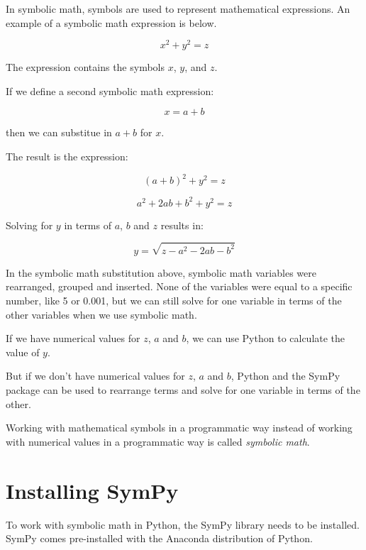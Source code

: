 \documentclass{book}
\begin{document}
In symbolic math, symbols are used to represent mathematical
expressions. An example of a symbolic math expression is below.

\[ x^{2} + y^{2} = z \]

The expression contains the symbols \(x\), \(y\), and \(z\).

If we define a second symbolic math expression:

\[ x = a + b \]

then we can substitue in \(a + b\) for \(x\).

The result is the expression:

\[ (a + b)^{2} + y^{2} = z \]

\[ a^{2} + 2ab + b^{2} + y^{2} = z \]

Solving for \(y\) in terms of \(a\), \(b\) and \(z\) results in:

\[ y = \sqrt{z - a^{2} - 2ab - b^{2}} \]

In the symbolic math substitution above, symbolic math variables were
rearranged, grouped and inserted. None of the variables were equal to a
specific number, like 5 or 0.001, but we can still solve for one
variable in terms of the other variables when we use symbolic math.
    




    
        If we have numerical values for \(z\), \(a\) and \(b\), we can use
Python to calculate the value of \(y\).

But if we don't have numerical values for \(z\), \(a\) and \(b\), Python
and the SymPy package can be used to rearrange terms and solve for one
variable in terms of the other.

Working with mathematical symbols in a programmatic way instead of
working with numerical values in a programmatic way is called
\emph{symbolic math}.
    




    
        \hypertarget{installing-sympy}{%
\section{Installing SymPy}\label{installing-sympy}}
    




    
        To work with symbolic math in Python, the SymPy library needs to be
installed. SymPy comes pre-installed with the Anaconda distribution of
Python.
    
\end{document}

